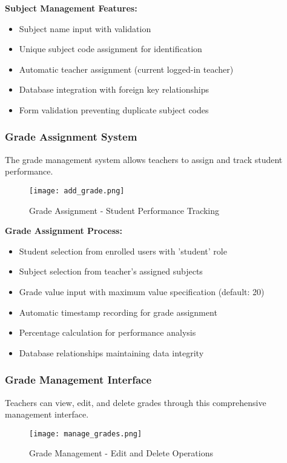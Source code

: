 \documentclass[12pt,a4paper]{article}
\begin{document}
\textbf{Subject Management Features:}
\begin{itemize}
    \item Subject name input with validation
    \item Unique subject code assignment for identification
    \item Automatic teacher assignment (current logged-in teacher)
    \item Database integration with foreign key relationships
    \item Form validation preventing duplicate subject codes
\end{itemize}

\subsubsection{Grade Assignment System}
The grade management system allows teachers to assign and track student performance.

\begin{figure}[h]
\centering
\texttt{[image: add\_grade.png]}
\caption{Grade Assignment - Student Performance Tracking}
\label{fig:add_grade}
\end{figure}

\textbf{Grade Assignment Process:}
\begin{itemize}
    \item Student selection from enrolled users with 'student' role
    \item Subject selection from teacher's assigned subjects
    \item Grade value input with maximum value specification (default: 20)
    \item Automatic timestamp recording for grade assignment
    \item Percentage calculation for performance analysis
    \item Database relationships maintaining data integrity
\end{itemize}

\subsubsection{Grade Management Interface}
Teachers can view, edit, and delete grades through this comprehensive management interface.

\begin{figure}[h]
\centering
\texttt{[image: manage\_grades.png]}
\caption{Grade Management - Edit and Delete Operations}
\label{fig:manage_grades}
\end{figure}
\end{document}
